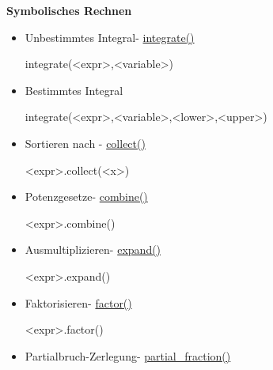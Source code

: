 \documentclass[a4paper,9pt,DIV15,twocolumn]{scrartcl}
\begin{document}
\textbf{Symbolisches Rechnen}
\begin{itemize}
\item Unbestimmtes Integral- \href{https://sage.math.uni-goettingen.de/doc/static/reference/sage/calculus/functional.html?highlight=diff#sage.calculus.functional.integral}{integrate()}
\begin{sagein}
integrate(<expr>,<variable>)
\end{sagein}
 \item Bestimmtes Integral
\begin{sagein}
integrate(<expr>,<variable>,<lower>,<upper>)
\end{sagein}
\end{itemize}
  \begin{itemize}

      
      \item Sortieren nach - \href{https://sage.math.uni-goettingen.de/doc/static/reference/sage/symbolic/expression.html?highlight=simplify_full#sage.symbolic.expression.Expression.collect}{collect()}
       \begin{sagein}
<expr>.collect(<x>)  
       \end{sagein}
   \item  Potenzgesetze- \href{https://sage.math.uni-goettingen.de/doc/static/reference/sage/symbolic/expression.html?highlight=simplify_full#sage.symbolic.expression.Expression.combine}{combine()}
       \begin{sagein}
<expr>.combine() 
       \end{sagein}
   \item Ausmultiplizieren- \href{https://sage.math.uni-goettingen.de/doc/static/reference/sage/symbolic/expression.html?highlight=simplify_full#sage.symbolic.expression.Expression.expand}{expand()}
       \begin{sagein}
<expr>.expand()  
       \end{sagein}
   \item Faktorisieren- \href{https://sage.math.uni-goettingen.de/doc/static/reference/sage/symbolic/expression.html?highlight=simplify_full#sage.symbolic.expression.Expression.factor}{factor()}
       \begin{sagein}
<expr>.factor()  
       \end{sagein}
   \item Partialbruch-Zerlegung- \href{https://sage.math.uni-goettingen.de/doc/static/reference/sage/symbolic/expression.html?highlight=simplify_full#sage.symbolic.expression.Expression.partial_fraction}{partial\_fraction()}

\end{itemize}
\end{document}
